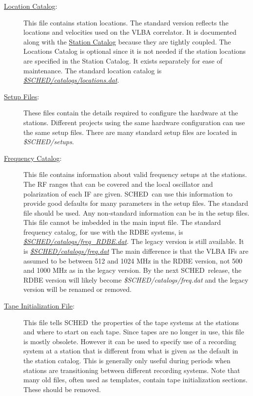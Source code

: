 \documentclass{report}
\newcommand{\schedb}{{\sc SCHED~}}
\begin{document}
\begin{description}
\item[
{\hyperref[SEC:STACAT]{Location Catalog}}:] This file contains
station locations.  The standard version reflects the locations and
velocities used on the VLBA correlator.  It is documented along with
the 
{\hyperref[SEC:STACAT]{Station Catalog}} because they are tightly
coupled.  The Locations Catalog is optional since it is not needed if
the station locations are specified in the Station Catalog.  It exists
separately for ease of maintenance.  The standard
location catalog is 
{\href{catalogs/locations.dat}{{\sl \$SCHED/catalogs/locations.dat}}}.

\item[
{\hyperref[SEC:SETUPS]{Setup Files}}:] These files contain the
details required to configure the hardware at the stations.  Different
projects using the same hardware configuration can use the same setup
files.  There are many standard setup files are located in
{\sl \$SCHED/setups}.

\item[
{\hyperref[SEC:FRQCAT]{Frequency Catalog}}:] This file contains
information about valid frequency setups at the stations.  The RF
ranges that can be covered and the local oscillator and polarization
of each IF are given.  \schedb can use this information to provide
good defaults for many parameters in the setup files.  The standard
file should be used.  Any non-standard information can be in the setup
files.  This file cannot be imbedded in the main input file.  The standard
frequency catalog, for use with the RDBE systems, is 
{\href{catalogs/freq\_RDBE.dat}{{\sl \$SCHED/catalogs/freq\_RDBE.dat}}}.
The legacy version is still available.  It is 
{\href{catalogs/freq.dat}{{\sl \$SCHED/catalogs/freq.dat}}}
The main difference is that the VLBA IFs are assumed to be between 512
and 1024 MHz in the RDBE version, not 500 and 1000 MHz as in the legacy
version.  By the next \schedb release, the RDBE version will likely become
{\sl \$SCHED/catalogs/freq.dat} and the legacy version will be renamed or
removed.

\item[
{\hyperref[SEC:TPINI]{Tape Initialization File}}:] This file tells
\schedb the properties of the tape systems at the stations and where
to start on each tape.  Since tapes are no longer in use, this file
is mostly obsolete.  However it can be used to specify use of a
recording system at a station that is different from what is given
as the default in the station catalog.  This is generally only useful
during periods when stations are transitioning between different
recording systems.  Note that many old files, often used as templates,
contain tape initialization sections.  These should be removed.


\end{description}
\end{document}
